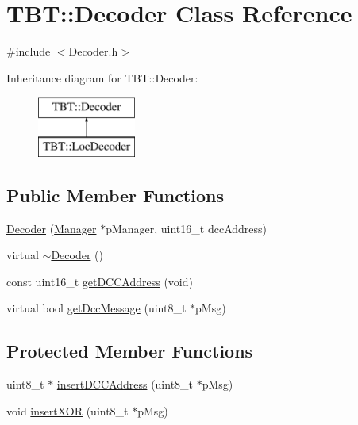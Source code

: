 \hypertarget{classTBT_1_1Decoder}{}\section{T\+BT\+:\+:Decoder Class Reference}
\label{classTBT_1_1Decoder}


{\ttfamily \#include $<$Decoder.\+h$>$}

Inheritance diagram for T\+BT\+:\+:Decoder\+:\begin{figure}[H]
\begin{center}
\leavevmode
\includegraphics[height=2.000000cm]{classTBT_1_1Decoder}
\end{center}
\end{figure}
\subsection*{Public Member Functions}
\begin{DoxyCompactItemize}
\item 
\hyperlink{classTBT_1_1Decoder_a69cc50cb8ca993a98802303b1c70eade_a69cc50cb8ca993a98802303b1c70eade}{Decoder} (\hyperlink{classTBT_1_1Manager}{Manager} $\ast$p\+Manager, uint16\+\_\+t dcc\+Address)
\item 
virtual \hyperlink{classTBT_1_1Decoder_a44ed2f46ad692e6d7604121ed92e4474_a44ed2f46ad692e6d7604121ed92e4474}{$\sim$\+Decoder} ()
\item 
const uint16\+\_\+t \hyperlink{classTBT_1_1Decoder_ad948e489ff1246effdfda3e68d693593_ad948e489ff1246effdfda3e68d693593}{get\+D\+C\+C\+Address} (void)
\item 
virtual bool \hyperlink{classTBT_1_1Decoder_a71c25cd52e7f591ba1771ee0518735ba_a71c25cd52e7f591ba1771ee0518735ba}{get\+Dcc\+Message} (uint8\+\_\+t $\ast$p\+Msg)
\end{DoxyCompactItemize}
\subsection*{Protected Member Functions}
\begin{DoxyCompactItemize}
\item 
uint8\+\_\+t $\ast$ \hyperlink{classTBT_1_1Decoder_a67cd8a5abe038afee52578f483b3d4e5_a67cd8a5abe038afee52578f483b3d4e5}{insert\+D\+C\+C\+Address} (uint8\+\_\+t $\ast$p\+Msg)
\item 
void \hyperlink{classTBT_1_1Decoder_aa57b9aaf222878861d93a8234a614b5d_aa57b9aaf222878861d93a8234a614b5d}{insert\+X\+OR} (uint8\+\_\+t $\ast$p\+Msg)
\end{DoxyCompactItemize}
